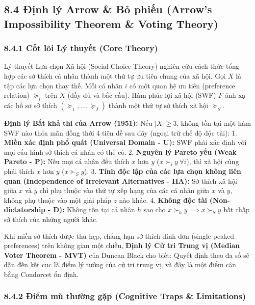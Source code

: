 \documentclass[
]{article}
\begin{document}
\subsection{8.4 Định lý Arrow \& Bỏ phiếu (Arrow's Impossibility Theorem
\& Voting
Theory)}\label{ux111ux1ecbnh-luxfd-arrow-bux1ecf-phiux1ebfu-arrows-impossibility-theorem-voting-theory}

\subsubsection{8.4.1 Cốt lõi Lý thuyết (Core
Theory)}\label{cux1ed1t-luxf5i-luxfd-thuyux1ebft-core-theory-28}

Lý thuyết Lựa chọn Xã hội (Social Choice Theory) nghiên cứu cách thức
tổng hợp các sở thích cá nhân thành một thứ tự ưu tiên chung của xã hội.
Gọi \(X\) là tập các lựa chọn thay thế. Mỗi cá nhân \(i\) có một quan hệ
ưu tiên (preference relation) \(\succeq_i\) trên \(X\) (đầy đủ và bắc
cầu). Hàm phúc lợi xã hội (SWF) \(F\) ánh xạ các hồ sơ sở thích
\(( \succeq_1, \dots, \succeq_I )\) thành một thứ tự sở thích xã hội
\(\succeq_S\).

\textbf{Định lý Bất khả thi của Arrow (1951):} Nếu \(|X| \geq 3\), không
tồn tại một hàm SWF nào thỏa mãn đồng thời 4 tiên đề sau đây (ngoại trừ
chế độ độc tài): 1. \textbf{Miền xác định phổ quát (Universal Domain -
U):} SWF phải xác định với mọi cấu hình sở thích cá nhân có thể có. 2.
\textbf{Nguyên lý Pareto yếu (Weak Pareto - P):} Nếu mọi cá nhân đều
thích \(x\) hơn \(y\) (\(x \succ_i y \ \forall i\)), thì xã hội cũng
phải thích \(x\) hơn \(y\) (\(x \succ_S y\)). 3. \textbf{Tính độc lập
của các lựa chọn không liên quan (Independence of Irrelevant
Alternatives - IIA):} Sở thích xã hội giữa \(x\) và \(y\) chỉ phụ thuộc
vào thứ tự xếp hạng của các cá nhân giữa \(x\) và \(y\), không phụ thuộc
vào một giải pháp \(z\) nào khác. 4. \textbf{Không độc tài
(Non-dictatorship - D):} Không tồn tại cá nhân \(h\) sao cho
\(x \succ_h y \implies x \succ_S y\) bất chấp sở thích của những người
khác.

Khi miền sở thích được thu hẹp, chẳng hạn sở thích đỉnh đơn
(single-peaked preferences) trên không gian một chiều, \textbf{Định lý
Cử tri Trung vị (Median Voter Theorem - MVT)} của Duncan Black cho biết:
Quyết định theo đa số sẽ dẫn đến kết cục là điểm lý tưởng của cử tri
trung vị, và đây là một điểm cân bằng Condorcet ổn định.

\subsubsection{8.4.2 Điểm mù thường gặp (Cognitive Traps \&
Limitations)}\label{ux111iux1ec3m-muxf9-thux1b0ux1eddng-gux1eb7p-cognitive-traps-limitations-57}
\end{document}
